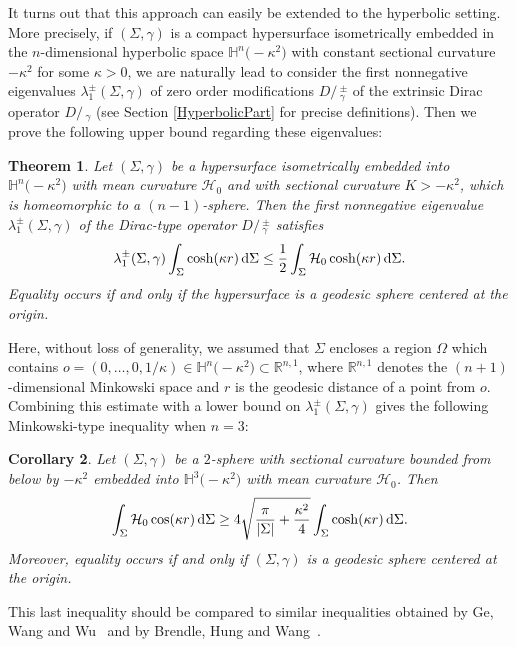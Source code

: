 \documentclass[pdftex]{sigma}
\numberwithin{equation}{section}
\newtheorem{Theorem}{Theorem}[section]
\newtheorem{Corollary}[Theorem]{Corollary}
\def\D{D\!\!\!\!/\,}
\begin{document}
It turns out that this approach can easily be extended to the hyperbolic setting. More precisely, if $(\Sigma,\gamma)$ is a compact hypersurface isometrically embedded in the $n$-dimensional hyperbolic space $\mathbb{H}^n\bigl(-\kappa^2\bigr)$ with constant sectional curvature $-\kappa^2$ for some $\kappa>0$, we are naturally lead to consider the first nonnegative eigenvalues $\lambda_1^\pm(\Sigma,\gamma)$ of zero order modifications $\D_\gamma^\pm$ of the extrinsic Dirac operator $\D_\gamma$ (see Section \ref{HyperbolicPart} for precise definitions). Then we prove the following upper bound regarding these eigenvalues:
\begin{Theorem}\label{NewUpperBoundHyperbolique}
Let $(\Sigma,\gamma)$ be a hypersurface isometrically embedded into $\mathbb{H}^n\bigl(-\kappa^2\bigr)$ with mean curvature $\mathcal{H}_0$ and with sectional curvature $K>-\kappa^2$, which is homeomorphic to a $(n-1)$-sphere. Then the first nonnegative eigenvalue $\lambda_1^\pm(\Sigma,\gamma)$ of the Dirac-type operator $\D_\gamma^\pm$ satisfies
\begin{gather}\label{NewUpperBoundHyp1}
\lambda_1^\pm(\Sigma,\gamma)\int_\Sigma \cosh(\kappa r)\,{\rm d}\Sigma\leq\frac{1}{2}\int_\Sigma \mathcal{H}_0\cosh(\kappa r)\,{\rm d}\Sigma.
\end{gather}
Equality occurs if and only if the hypersurface is a geodesic sphere centered at the origin.
\end{Theorem}
Here, without loss of generality, we assumed that $\Sigma$ encloses a region $\Omega$ which contains $o=(0,\dots,0,1/\kappa)\in\mathbb{H}^n\bigl(-\kappa^2\bigr)\subset\mathbb{R}^{n,1}$, where $\mathbb{R}^{n,1}$ denotes the $(n+1)$-dimensional Minkowski space and $r$ is the geodesic distance of a point from $o$. Combining this estimate with a lower bound on $\lambda_1^\pm(\Sigma,\gamma)$ gives the following Minkowski-type inequality when $n=3$:
\begin{Corollary}\label{MinkowskiHyperbolic}
Let $(\Sigma,\gamma)$ be a $2$-sphere with sectional curvature bounded from below by $-\kappa^2$ embedded into $\mathbb{H}^3\bigl(-\kappa^2\bigr)$ with mean curvature $\mathcal{H}_0$. Then
\begin{gather}\label{MinkowskiHyperbolic1}
\int_\Sigma\mathcal{H}_0\cos(\kappa r)\,{\rm d}\Sigma\geq 4\sqrt{\frac{\pi}{|\Sigma|}+\frac{\kappa^2}{4}}\int_\Sigma\cosh(\kappa r)\,{\rm d}\Sigma.
\end{gather}
Moreover, equality occurs if and only if $(\Sigma,\gamma)$ is a geodesic sphere centered at the origin.
\end{Corollary}
This last inequality should be compared to similar inequalities obtained by Ge, Wang and Wu~\cite{GeWangWu} and by Brendle, Hung and Wang~\cite{BrendleHungWang}.
\end{document}

